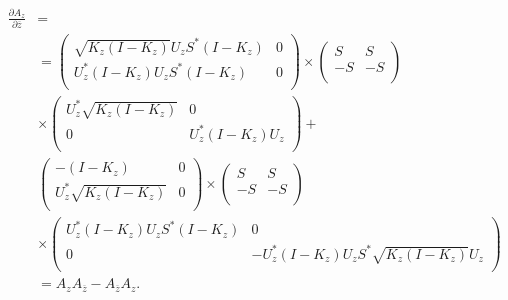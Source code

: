 \documentclass{amsart}
\begin{document}
\begin{align*}
\frac{\partial A_{z} }{\partial \overline{z}} &= \\
&=  \left(
                                       \begin{array}{cc}
                                      \sqrt{K_z(I- K_{z})}U_{z}S^{*} (I-K_z) & 0 \\
                                         U^{*}_{z}(I-K_{z})U_{z}S^{*}(I - K_z)& 0 \\
                                       \end{array}
                                     \right) \times
                                     \left(
                                       \begin{array}{cc}
                                         S & S \\
                                         -S & -S \\
                                       \end{array}
                                     \right)\\
&\times
                                     \left(
                                       \begin{array}{cc}
                                         U^{*}_{z}\sqrt{K_{z}(I-K_{z})} & 0 \\
                                         0 & U^{*}_{z}(I- K_{z})U_z \\
                                       \end{array}
                                     \right) + \\
& \left(
                                       \begin{array}{cc}
                                        - (I-K_z) & 0 \\
                                         U^{*}_{z}\sqrt{K_{z}(I-K_{z})} & 0 \\
                                       \end{array}
                                     \right) \times
                                     \left(
                                       \begin{array}{cc}
                                         S & S \\
                                         -S & -S \\
                                       \end{array}
                                     \right) \\
&\times
                                     \left(
                                       \begin{array}{cc}
                                          U^{*}_{z}(I-K_{z})U_{z}S^{*}(I - K_z) & 0 \\
                                         0 &  -U^{*}_{z}(I-K_{z})U_{z}S^{*}\sqrt{K_{z}(I- K_{z})}U_{z} \\
                                       \end{array}
                                     \right)\\
& = A_{z}A_{\overline{z}} - A_{\overline{z}}A_{z} .
\end{align*}
\end{document}
